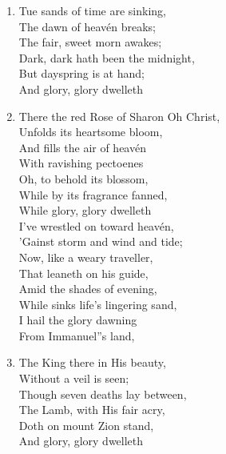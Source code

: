 \documentclass[11pt,a4paper]{article}
\begin{document}
\begin{enumerate}
    \item Tue sands of time are sinking, \\
        The dawn of heavén breaks; \\
        The fair, sweet morn awakes; \\
        Dark, dark hath been the midnight, \\
        But dayspring is at hand; \\
        And glory, glory dwelleth

    \item There the red Rose of Sharon Oh Christ, \\
        Unfolds its heartsome bloom, \\
        And fills the air of heavén \\
        With ravishing pectoenes \\
        Oh, to behold its blossom, \\
        While by its fragrance fanned, \\
        While glory, glory dwelleth \\
        I've wrestled on toward heavén, \\
        'Gainst storm and wind and tide; \\
        Now, like a weary traveller, \\
        That leaneth on his guide, \\
        Amid the shades of evening, \\
        While sinks life's lingering sand, \\
        I hail the glory dawning \\
        From Immanuel''s land,

    \item The King there in His beauty, \\
        Without a veil is seen; \\
        Though seven deaths lay between, \\
        The Lamb, with His fair acry, \\
        Doth on mount Zion stand, \\
        And glory, glory dwelleth


\end{enumerate}
\end{document}
